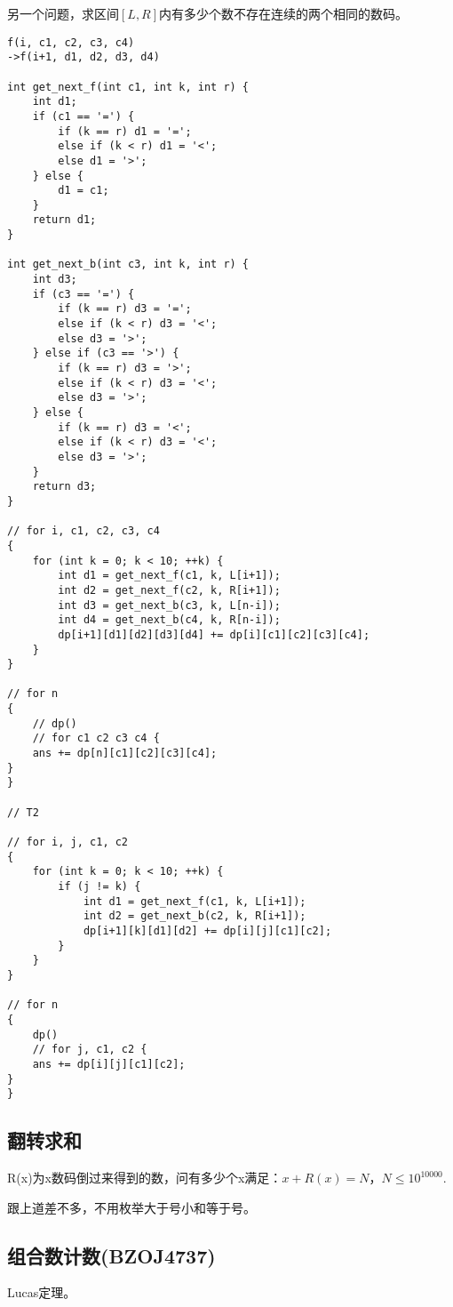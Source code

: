 另一个问题，求区间$[L,R]$内有多少个数不存在连续的两个相同的数码。
\begin{verbatim}
f(i, c1, c2, c3, c4)
->f(i+1, d1, d2, d3, d4)

int get_next_f(int c1, int k, int r) {
    int d1;
    if (c1 == '=') {
        if (k == r) d1 = '=';
        else if (k < r) d1 = '<';
        else d1 = '>';
    } else {
        d1 = c1;
    }
    return d1;
}

int get_next_b(int c3, int k, int r) {
    int d3;
    if (c3 == '=') {
        if (k == r) d3 = '=';
        else if (k < r) d3 = '<';
        else d3 = '>';
    } else if (c3 == '>') {
        if (k == r) d3 = '>';
        else if (k < r) d3 = '<';
        else d3 = '>';
    } else {
        if (k == r) d3 = '<';
        else if (k < r) d3 = '<';
        else d3 = '>';
    }
    return d3;
}

// for i, c1, c2, c3, c4
{
    for (int k = 0; k < 10; ++k) {
        int d1 = get_next_f(c1, k, L[i+1]);
        int d2 = get_next_f(c2, k, R[i+1]);
        int d3 = get_next_b(c3, k, L[n-i]);
        int d4 = get_next_b(c4, k, R[n-i]);
        dp[i+1][d1][d2][d3][d4] += dp[i][c1][c2][c3][c4];
    }
}

// for n
{
    // dp()
    // for c1 c2 c3 c4 {
    ans += dp[n][c1][c2][c3][c4];
}
}

// T2

// for i, j, c1, c2
{
    for (int k = 0; k < 10; ++k) {
        if (j != k) {
            int d1 = get_next_f(c1, k, L[i+1]);
            int d2 = get_next_b(c2, k, R[i+1]);
            dp[i+1][k][d1][d2] += dp[i][j][c1][c2];
        }
    }
}

// for n
{
    dp()
    // for j, c1, c2 {
    ans += dp[i][j][c1][c2];
}
}
\end{verbatim}
\subsection{翻转求和}
R(x)为x数码倒过来得到的数，问有多少个x满足：$x+R(x)=N$，$N\le 10^{10000}.$

跟上道差不多，不用枚举大于号小和等于号。
\subsection{组合数计数(BZOJ4737)}
Lucas定理。

